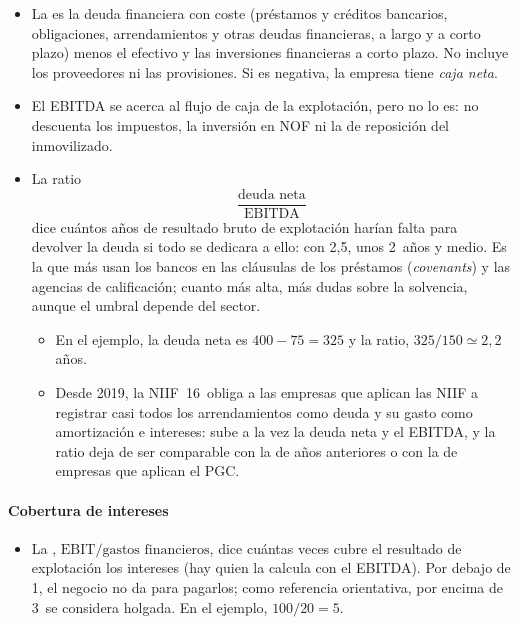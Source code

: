 \documentclass[11pt]{article}
\begin{document}
\begin{itemize}
\item La  es la deuda financiera con coste (préstamos y créditos bancarios, obligaciones, arrendamientos y otras deudas financieras, a largo y a corto plazo) menos el efectivo y las inversiones financieras a corto plazo. No incluye los proveedores ni las provisiones. Si es negativa, la empresa tiene \emph{caja neta}.
\item El EBITDA se acerca al flujo de caja de la explotación, pero no lo es: no descuenta los impuestos, la inversión en NOF ni la de reposición del inmovilizado.
\item La ratio
  \[
  \frac{\text{deuda neta}}{\mathrm{EBITDA}}
  \]
  dice cuántos años de resultado bruto de explotación harían falta para devolver la deuda si todo se dedicara a ello: con 2,5, unos 2~años y medio. Es la que más usan los bancos en las cláusulas de los préstamos (\emph{covenants}) y las agencias de calificación; cuanto más alta, más dudas sobre la solvencia, aunque el umbral depende del sector.
  \begin{itemize}
  \item En el ejemplo, la deuda neta es $400-75=325$ y la ratio, $325/150\simeq2{,}2$ años.
  \item Desde 2019, la NIIF~16~obliga a las empresas que aplican las NIIF a registrar casi todos los arrendamientos como deuda y su gasto como amortización e intereses: sube a la vez la deuda neta y el EBITDA, y la ratio deja de ser comparable con la de años anteriores o con la de empresas que aplican el PGC\nocite{IASB2016NIIF16}.
  \end{itemize}
\end{itemize}

\paragraph{Cobertura de intereses}

\begin{itemize}
\item La , $\mathrm{EBIT}/\text{gastos financieros}$, dice cuántas veces cubre el resultado de explotación los intereses (hay quien la calcula con el EBITDA). Por debajo de 1, el negocio no da para pagarlos; como referencia orientativa, por encima de 3~se considera holgada\nocite{GarridoIniguez2017Analisis}. En el ejemplo, $100/20=5$.
\end{itemize}
\end{document}
